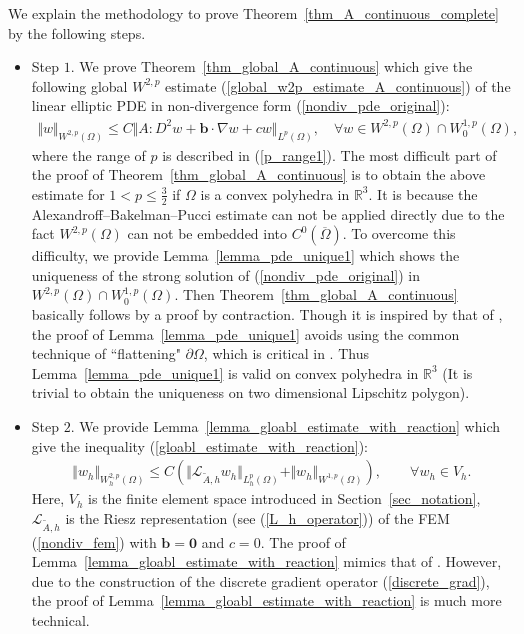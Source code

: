 \documentclass[12pt]{amsart}
\theoremstyle{definition}
\theoremstyle{remark}
\begin{document}
We explain the methodology to prove 
Theorem~\ref{thm_A_continuous_complete} by the following steps. 
\begin{itemize}

\item Step $1$. We prove Theorem~\ref{thm_global_A_continuous} which give the following global 
$W^{2,p}$ estimate (\ref{global_w2p_estimate_A_continuous}) of the linear elliptic PDE in 
non-divergence form (\ref{nondiv_pde_original}):
\begin{align*}
\Vert w\Vert_{W^{2,p}(\Omega)} \leq C \Vert A:D^{2}w + \boldsymbol{b}\cdot\nabla w + cw \Vert_{L^{p}(\Omega)}, 
\quad \forall w \in W^{2,p}(\Omega) \cap W_{0}^{1,p}(\Omega),
\end{align*} 
where the range of $p$ is described in (\ref{p_range1}).
The most difficult part of the proof of Theorem~\ref{thm_global_A_continuous} is to 
obtain the above estimate for $1 < p \leq \frac{3}{2}$ if 
$\Omega$ is a convex polyhedra in $\mathbb{R}^{3}$. It is because the Alexandroff–Bakelman–Pucci estimate 
can not be applied directly due to the fact $W^{2,p}(\Omega)$ can not be embedded into $C^{0}(\overline{\Omega})$.
To overcome this difficulty, we provide Lemma~\ref{lemma_pde_unique1} which shows the uniqueness of the strong solution 
of (\ref{nondiv_pde_original}) in $W^{2,p}(\Omega) \cap W_{0}^{1,p}(\Omega)$. Then Theorem~\ref{thm_global_A_continuous} 
basically follows \cite[Theorem~$1.1$]{QT2023} by a proof by contraction. 
Though it is inspired by that of \cite[Lemma~$9.16$]{GT01}, 
the proof of Lemma~\ref{lemma_pde_unique1} avoids using the common technique of ``flattening" 
$\partial\Omega$, which is critical in \cite[Lemma~$9.16$]{GT01}. Thus Lemma~\ref{lemma_pde_unique1} 
is valid on convex polyhedra in $\mathbb{R}^{3}$ (It is trivial to obtain the uniqueness on two dimensional 
Lipschitz polygon). 

\item Step $2$. We provide Lemma~\ref{lemma_gloabl_estimate_with_reaction} which give the inequality 
(\ref{gloabl_estimate_with_reaction}): 
\begin{align*}
\Vert w_{h} \Vert_{W_{h}^{2,p}(\Omega)} \leq C \left( \Vert \mathcal{L}_{\tilde{A},h}w_{h}\Vert_{L_{h}^{p}(\Omega)} 
+ \Vert w_{h}\Vert_{W^{1,p}(\Omega)} \right), \qquad \forall w_{h} \in V_{h}.
\end{align*}
Here, $V_{h}$ is the finite element space introduced in Section~\ref{sec_notation}, 
$\mathcal{L}_{\tilde{A},h}$ is the Riesz representation (see (\ref{L_h_operator})) of the FEM (\ref{nondiv_fem}) with 
$\boldsymbol{b}=\boldsymbol{0}$ and $c=0$.
 The proof of Lemma~\ref{lemma_gloabl_estimate_with_reaction} 
mimics that of \cite[Lemma~$3.4$]{FHM2017}. However, due to the construction of the discrete gradient 
operator (\ref{discrete_grad}), the proof of Lemma~\ref{lemma_gloabl_estimate_with_reaction} is much 
more technical.


\end{itemize}
\end{document}
